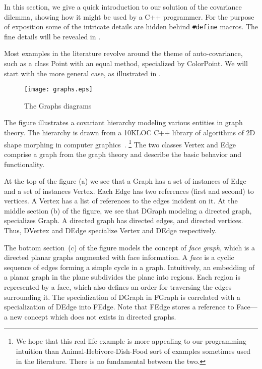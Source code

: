 \documentclass[11pt]{article}
\numberwithin{figure}{section}
\newcommand\CC{\Lang{\mbox{C++}}\xspace}
\newcommand\Lang[1]{\textsc{#1}}
\newcommand\Cls[1]{\textsf{#1}}
\begin{document}
In this section, we give a quick introduction to our solution
    of the covariance dilemma, showing how it might be used by a \CC programmer.
For the purpose of exposition some of the intricate details are hidden
    behind \texttt{\#define} macros.
The fine details will be revealed in .

Most examples in the literature revolve around the theme of auto-covariance,
    such as a class \Cls{Point} with an \Cls{equal} method,
    specialized by \Cls{ColorPoint}.
We will start with the more general case, as
    illustrated in .

\begin{figure}[!htb] %
\texttt{[image: graphs.eps]}
\caption{The Graphs diagrams}
\label{Figure:Graphs}
\end{figure}

The figure illustrates a covariant hierarchy
    modeling various entities in graph theory.
The hierarchy is drawn from a 10KLOC \CC library
    of algorithms of 2D shape morphing in computer
    graphics~\cite{Gotsman:Surazhsky:01}.%
\footnote{We hope that this real-life example is more appealing to our programming
    intuition than \Cls{Animal}-\Cls{Hebivore}-\Cls{Dish}-\Cls{Food} sort
    of examples sometimes used in the literature.
There is no fundamental between the two.}
The two classes \Cls{Vertex} and \Cls{Edge} comprise
    a graph from the graph theory and describe the basic behavior and functionality.

At the top of the figure (a) we see that a \Cls{Graph} has a set of instances of \Cls{Edge}
    and a set of instances \Cls{Vertex}.
Each \Cls{Edge} has two references (\Cls{first} and \Cls{second}) to vertices.
A \Cls{Vertex} has a list of references to the edges incident on it.
At the middle section (b) of the figure, we see that \Cls{DGraph} modeling
    a directed graph, specializes \Cls{Graph}.
A directed graph has directed edges, and directed vertices.
Thus, \Cls{DVertex} and \Cls{DEdge} specialize \Cls{Vertex} and
    \Cls{DEdge} respectively.

The bottom section~(c) of the figure models the concept of \emph{face graph},
    which is a directed planar graphs augmented with face information.
A \emph{face} is a cyclic sequence of edges forming
    a simple cycle in a graph.
Intuitively, an embedding of a planar graph in the plane
    subdivides the plane into regions.
Each region is represented by a face, which also defines an
    order for traversing the edges surrounding it.
The specialization of \Cls{DGraph} in \Cls{FGraph} is correlated
    with a specialization of \Cls{DEdge} into \Cls{FEdge}.
Note that \Cls{FEdge} stores a reference to \Cls{Face}---a new concept
    which does not exists in directed graphs.
\end{document}
